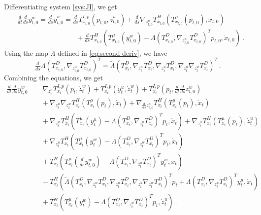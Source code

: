 \documentclass[final]{svjour3}
\newcommand{\df}[2]{\tfrac{d}{d#2} #1}
\begin{document}
    Differentiating system \eqref{sys:JI}, we get
    \begin{align*}
        &\df{\df{y_{t,0}^w}{s}}{t}
        =
        \df{\dot{y}_{t,0}^w}{s}
        =
        \df{T_{x_{t,0}}^{I,p}(p_{t,0},\dot{z}^w_{t,0})}{s}
                +
                \df{\nabla_{z^w_{t,0}}T_{x_{t,0}}^H(T_{x_{t,0}}^\mu(p_{t,0}),\dot{x}_{t,0})}{s}
        \\
        &\qquad\qquad\qquad\qquad\enspace
                +
                \df{T_{x_{t,0}}^H(
                T^\mu_{x_{t,0}}(y^w_{t,0})
                -\Lambda(T_{x_{t,0}}^D,\nabla_{z^w_{t,0}}T_{x_{t,0}}^D)^Tp_{t,0}
                ,
                \dot{x}_{t,0})}{s}
        \ .
    \end{align*}
    Using the map $\tilde{\Lambda}$ defined in \eqref{eq:second-deriv}, we have
    \begin{equation*}
        \df{\Lambda(T_{x_{t,0}}^D,\nabla_{z^w_{t,0}}T_{x_{t,0}}^D)}{s}^T
        =
        \tilde{\Lambda}(T_{x_{t}}^D,
        \nabla_{z^w_{t}}T_{x_{t}}^D,
        \nabla_{z^u_{t}}T_{x_{t}}^D,
        \nabla_{z^u_t}\nabla_{z^w_{t}}T_{x_{t}}^D
        )^T \ .
    \end{equation*}
    Combining the equations, we get
    \begin{align*}
        \df{\df{y_{t,0}^w}{s}}{t}
        &=
        \nabla_{z^u_t}T_{x_{t}}^{I,p}(p_{t},\dot{z}^w_{t})
        +T_{x_{t}}^{I,p}(y^u_t,\dot{z}^w_{t})
        +T_{x_{t}}^{I,p}(p_{t},\df{\df{z^w_{t,0}}{s}}{t})
        \\
        &\quad\,
        +\nabla_{z^u_t}\nabla_{z^w_{t}}T_{x_{t}}^H(T_{x_{t}}^\mu(p_{t}),\dot{x}_{t})
        +\nabla_{\df{z^w_{t,0}}{s}}T_{x_{t}}^H(T_{x_{t}}^\mu(p_{t}),\dot{x}_{t})
        \\
        &\quad\,
        +\nabla_{z^w_{t}}T_{x_{t}}^H(
                T^\mu_{x_{t}}(y^u_t)
                -\Lambda(T_{x_{t}}^D,\nabla_{z^u_t}T_{x_t}^D)^Tp_t
        ,\dot{x}_{t})
        +\nabla_{z^w_{t}}T_{x_{t}}^H(T_{x_{t}}^\mu(p_{t}),\dot{z}^u_{t})
        \\
        &\quad\,
        +\nabla_{z^u_t}T_{x_{t}}^H(
        T^\mu_{x_{t}}(y^w_{t})
        -\Lambda(T_{x_{t}}^D,\nabla_{z^w_{t}}T_{x_{t}}^D)^Tp_{t}
        ,
        \dot{x}_{t})
        \\
        &\quad\,
        +T_{x_{t}}^H(
        T^\mu_{x_{t}}(\df{y^w_{t,0}}{s})
        -\Lambda(T_{x_{t}}^D,\nabla_{z^u_{t}}T_{x_{t}}^D)^Ty^w_{t}
        ,
        \dot{x}_{t})
        \\
        &\quad\,
        -T_{x_{t}}^H(
        \tilde{\Lambda}(T_{x_{t}}^D,
        \nabla_{z^w_{t}}T_{x_{t}}^D,
        \nabla_{z^u_{t}}T_{x_{t}}^D,
        \nabla_{z^u_t}\nabla_{z^w_{t}}T_{x_{t}}^D
        )^Tp_t
        +
        \Lambda(T_{x_{t}}^D,\nabla_{z^u_{t}}T_{x_{t}}^D)^Ty^u_{t}
        ,
        \dot{x}_{t})
        \\
        &\quad\,
        +T_{x_{t}}^H(
        T^\mu_{x_{t}}(y^w_{t})
        -\Lambda(T_{x_{t}}^D,\nabla_{z^w_{t}}T_{x_{t}}^D)^Tp_{t}
        ,
        \dot{z}^u_{t})
        \ .
    \end{align*}
\end{document}
